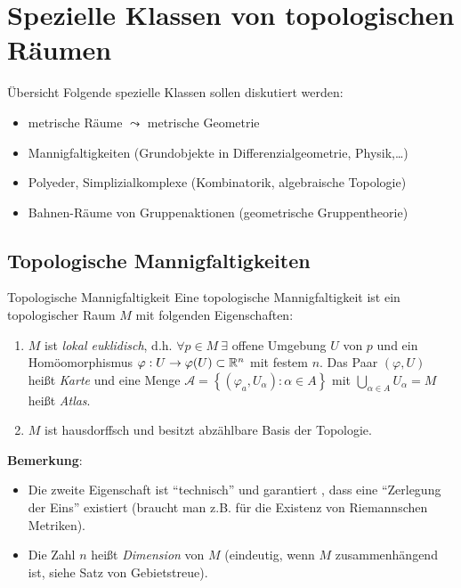 \chapter{Spezielle Klassen von topologischen Räumen}

\begin{bla}{Übersicht}
  Folgende spezielle Klassen sollen diskutiert werden:
  \begin{itemize}
    \item metrische Räume $ \leadsto $ metrische Geometrie
    \item Mannigfaltigkeiten (Grundobjekte in Differenzialgeometrie, Physik,\dots)
    \item Polyeder, Simplizialkomplexe (Kombinatorik, algebraische Topologie)
    \item Bahnen-Räume von Gruppenaktionen (geometrische Gruppentheorie)
  \end{itemize}
\end{bla}

\section{Topologische Mannigfaltigkeiten}

\begin{definition}{Topologische Mannigfaltigkeit}
  Eine topologische Mannigfaltigkeit ist ein topologischer Raum $ M $ mit folgenden Eigenschaften:
  \begin{enumerate}
    \item $ M $ ist \emph{lokal euklidisch}, d.h. $ \forall p \in M \ \exists $ offene Umgebung $ U $ von $ p $ und ein Homöomorphismus $ \varphi: U \to \varphi(U) \subset \mathbb{R}^n $ mit festem $ n $. Das Paar $ (\varphi, U) $ heißt \emph{Karte} und eine Menge $ \mathcal{A} = \left\{ (\varphi_a, U_\alpha) : \alpha \in A \right\} $ mit $ \bigcup_{\alpha \in A}U_\alpha = M $ heißt \emph{Atlas}.
    \item $ M $ ist hausdorffsch und besitzt abzählbare Basis der Topologie.
  \end{enumerate}
  \textbf{Bemerkung}:
  \begin{itemize}
    \item Die zweite Eigenschaft ist ``technisch'' und garantiert , dass eine ``Zerlegung der Eins'' existiert (braucht man z.B. für die Existenz von Riemannschen Metriken). 
    \item Die Zahl $ n $ heißt \emph{Dimension} von $ M $ (eindeutig, wenn $ M $ zusammenhängend ist, siehe Satz von Gebietstreue). 
  \end{itemize}
\end{definition}
